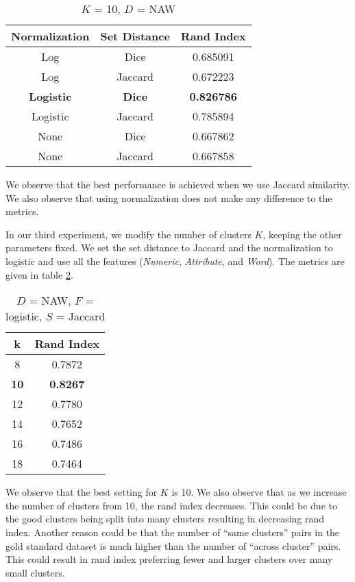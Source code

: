 \documentclass{article}
\begin{document}
\begin{table}
  \begin{center}
    \begin{tabular}{| c | c | c |}
    	\hline
       		Normalization & Set Distance & Rand Index \\
       	\hline
          Log & Dice & 0.685091 \\
          Log & Jaccard & 0.672223 \\
          \textbf{Logistic} & \textbf{Dice} & \textbf{0.826786} \\
          Logistic & Jaccard & 0.785894 \\
          None & Dice & 0.667862 \\
          None & Jaccard & 0.667858 \\
        \hline
    \end{tabular}
    \caption{$K$ = 10, $D$ = NAW}
    \label{tab:func}
  \end{center}
\end{table}

We observe that the best performance is achieved when we use Jaccard similarity.
We also observe that using normalization does not make any difference to the metrics.

In our third experiment, we modify the number of clusters $K$, keeping the other parameters fixed.
We set the set distance to Jaccard and the normalization to logistic and use all the features  (\textit{Numeric}, \textit{Attribute}, and \textit{Word}).
The metrics are given in table \ref{tab:cluster}. 
\begin{table}
  \begin{center}
    \begin{tabular}{| c | c |}
       \hline
       	 k & Rand Index \\
       \hline
         8 & 0.7872 \\
         \textbf{10} & \textbf{0.8267} \\
         12 & 0.7780 \\
         14 & 0.7652\\
         16 & 0.7486 \\
         18 & 0.7464 \\
       \hline
    \end{tabular}
    \caption{$D$ = NAW, $F$ = logistic, $S$ = Jaccard}
    \label{tab:cluster}
  \end{center}
\end{table}

We observe that the best setting for $K$ is 10.
We also observe that as we increase the number of clusters from 10, the rand index decreases.
This could be due to the good clusters being split into many clusters resulting in decreasing rand index.
Another reason could be that the number of ``same clusters'' pairs in the gold standard dataset is much higher than the number of ``across cluster'' pairs.
This could result in rand index preferring fewer and larger clusters over many small clusters.
\end{document}
